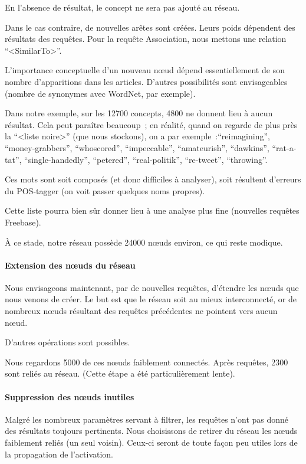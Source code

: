 \documentclass[a4paper, 12pt]{article}
\begin{document}
En l'absence de résultat, le concept ne sera pas ajouté au réseau.

Dans le cas contraire, de nouvelles arêtes sont créées. Leurs poids dépendent des résultats des requêtes. Pour la requête Association, nous mettons une relation ``<SimilarTo>''.

L'importance conceptuelle d'un nouveau nœud dépend essentiellement de son nombre d'apparitions dans les articles. D'autres possibilités sont envisageables (nombre de synonymes avec WordNet, par exemple).

Dans notre exemple, sur les 12700 concepts, 4800 ne donnent lieu à aucun résultat. Cela peut paraître beaucoup~; en réalité, quand on regarde de plus près la ``<liste noire>'' (que nous stockons), on a par exemple~:``reimagining'', ``money-grabbers'', ``whoscored'', ``impeccable'', ``amateurish'', ``dawkins'', ``rat-a-tat'', ``single-handedly'', ``petered'', ``real-politik'', ``re-tweet'', ``throwing''.

Ces mots sont soit composés (et donc difficiles à analyser), soit résultent d'erreurs du POS-tagger (on voit passer quelques noms propres).

Cette liste pourra bien sûr donner lieu à une analyse plus fine (nouvelles requêtes Freebase).

\`A ce stade, notre réseau possède 24000 nœuds environ, ce qui reste modique.

\paragraph{Extension des nœuds du réseau}

Nous envisageons maintenant, par de nouvelles requêtes, d'étendre les nœuds que nous venons de créer. Le but est que le réseau soit au mieux interconnecté, or de nombreux nœuds résultant des requêtes précédentes ne pointent vers aucun nœud.

D'autres opérations sont possibles.

Nous regardons 5000 de ces nœuds faiblement connectés. Après requêtes, 2300 sont reliés au réseau. (Cette étape a été particulièrement lente).

\paragraph{Suppression des nœuds inutiles}

Malgré les nombreux paramètres servant à filtrer, les requêtes n'ont pas donné des résultats toujours pertinents. Nous choisissons de retirer du réseau les nœuds faiblement reliés (un seul voisin). Ceux-ci seront de toute fa\c{c}on peu utiles lors de la propagation de l'activation.
\end{document}
